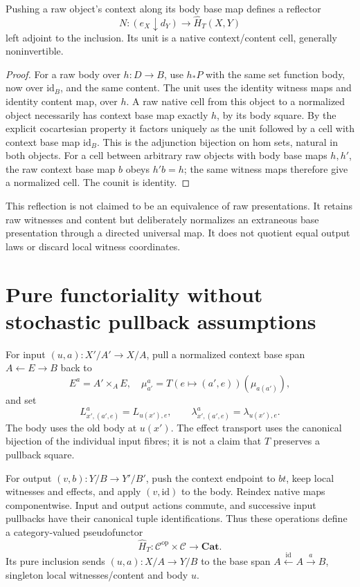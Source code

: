 \documentclass[11pt]{article}
\begin{document}
\begin{proposition}
Pushing a raw object's context along its body base map defines a reflector
\[
 N:(e_X\downarrow d_Y)\longrightarrow\widehat H_T(X,Y)
\]
left adjoint to the inclusion. Its unit is a native context/content cell, generally noninvertible.
\end{proposition}
\begin{proof}
For a raw body over $h:D\to B$, use $h_*P$ with the same set function body, now over $\mathrm{id}_B$, and the same content. The unit uses the identity witness maps and identity content map, over $h$. A raw native cell from this object to a normalized object necessarily has context base map exactly $h$, by its body square. By the explicit cocartesian property it factors uniquely as the unit followed by a cell with context base map $\mathrm{id}_B$. This is the adjunction bijection on hom sets, natural in both objects. For a cell between arbitrary raw objects with body base maps $h,h'$, the raw context base map $b$ obeys $h'b=h$; the same witness maps therefore give a normalized cell. The counit is identity.
\end{proof}

This reflection is not claimed to be an equivalence of raw presentations. It retains raw witnesses and content but deliberately normalizes an extraneous base presentation through a directed universal map. It does not quotient equal output laws or discard local witness coordinates.

\section{Pure functoriality without stochastic pullback assumptions}
For input $(u,a):X'/A'\to X/A$, pull a normalized context base span $A\leftarrow E\to B$ back to
\[
 E^a=A'\times_A E,
 \quad \mu^a_{a'}=T(e\mapsto(a',e))(\mu_{a(a')}),
\]
and set
\[
 L^a_{x',(a',e)}=L_{u(x'),e},\qquad
 \lambda^a_{x',(a',e)}=\lambda_{u(x'),e}.
\]
The body uses the old body at $u(x')$. The effect transport uses the canonical bijection of the individual input fibres; it is not a claim that $T$ preserves a pullback square.

For output $(v,b):Y/B\to Y'/B'$, push the context endpoint to $bt$, keep local witnesses and effects, and apply $(v,\mathrm{id})$ to the body. Reindex native maps componentwise. Input and output actions commute, and successive input pullbacks have their canonical tuple identifications. Thus these operations define a category-valued pseudofunctor
\[
 \widehat H_T:\mathcal C^{\mathrm{op}}\times\mathcal C\to\mathbf{Cat}.
\]
Its pure inclusion sends $(u,a):X/A\to Y/B$ to the base span $A\xleftarrow{\mathrm{id}}A\xrightarrow a B$, singleton local witnesses/content and body $u$.
\end{document}
